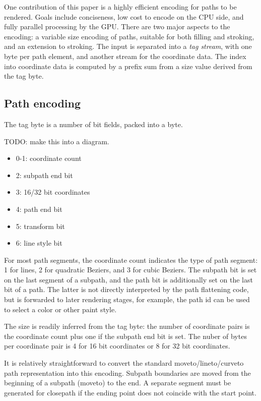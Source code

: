 \documentclass[format=acmsmall]{acmart}
\begin{document}
One contribution of this paper is a highly efficient encoding for paths to be rendered. Goals include conciseness, low cost to encode on the CPU side, and fully parallel processing by the GPU. There are two major aspects to the encoding: a variable size encoding of paths, suitable for both filling and stroking, and an extension to stroking. The input is separated into a \emph{tag stream}, with one byte per path element, and another stream for the coordinate data. The index into coordinate data is computed by a prefix sum from a size value derived from the tag byte.

\subsection{Path encoding}

The tag byte is a number of bit fields, packed into a byte.

TODO: make this into a diagram.

\begin{itemize}
    \item 0-1: coordinate count
    \item 2: subpath end bit
    \item 3: 16/32 bit coordinates
    \item 4: path end bit
    \item 5: transform bit
    \item 6: line style bit
\end{itemize}

For most path segments, the coordinate count indicates the type of path segment: 1 for lines, 2 for quadratic Beziers, and 3 for cubic Beziers. The subpath bit is set on the last segment of a subpath, and the path bit is additionally set on the last bit of a path. The latter is not directly interpreted by the path flattening code, but is forwarded to later rendering stages, for example, the path id can be used to select a color or other paint style.

The size is readily inferred from the tag byte: the number of coordinate pairs is the coordinate count plus one if the subpath end bit is set. The nuber of bytes per coordinate pair is 4 for 16 bit coordinates or 8 for 32 bit coordinates.

It is relatively straightforward to convert the standard moveto/lineto/curveto path representation into this encoding. Subpath boundaries are moved from the beginning of a subpath (moveto) to the end. A separate segment must be generated for closepath if the ending point does not coincide with the start point.
\end{document}
